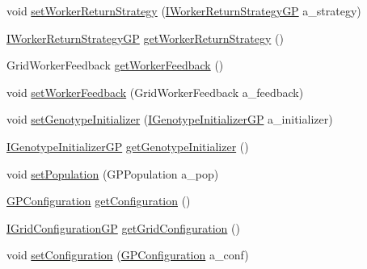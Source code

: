 \begin{DoxyCompactItemize}
\item 
void \hyperlink{classorg_1_1jgap_1_1distr_1_1grid_1_1gp_1_1_j_g_a_p_request_g_p_aa547978291ad96057848eed7b72f91ba}{set\-Worker\-Return\-Strategy} (\hyperlink{interfaceorg_1_1jgap_1_1distr_1_1grid_1_1gp_1_1_i_worker_return_strategy_g_p}{I\-Worker\-Return\-Strategy\-G\-P} a\-\_\-strategy)
\item 
\hyperlink{interfaceorg_1_1jgap_1_1distr_1_1grid_1_1gp_1_1_i_worker_return_strategy_g_p}{I\-Worker\-Return\-Strategy\-G\-P} \hyperlink{classorg_1_1jgap_1_1distr_1_1grid_1_1gp_1_1_j_g_a_p_request_g_p_a31191d5018e486864ec5762de10bafc5}{get\-Worker\-Return\-Strategy} ()
\item 
Grid\-Worker\-Feedback \hyperlink{classorg_1_1jgap_1_1distr_1_1grid_1_1gp_1_1_j_g_a_p_request_g_p_a4eb1db083d15fba5235c1a3e2de4a4d2}{get\-Worker\-Feedback} ()
\item 
void \hyperlink{classorg_1_1jgap_1_1distr_1_1grid_1_1gp_1_1_j_g_a_p_request_g_p_adfd2c2f2a4edb10f955959b45c608b4e}{set\-Worker\-Feedback} (Grid\-Worker\-Feedback a\-\_\-feedback)
\item 
void \hyperlink{classorg_1_1jgap_1_1distr_1_1grid_1_1gp_1_1_j_g_a_p_request_g_p_a2bd880a9f50c5faf7cc80ae986767fa3}{set\-Genotype\-Initializer} (\hyperlink{interfaceorg_1_1jgap_1_1distr_1_1grid_1_1gp_1_1_i_genotype_initializer_g_p}{I\-Genotype\-Initializer\-G\-P} a\-\_\-initializer)
\item 
\hyperlink{interfaceorg_1_1jgap_1_1distr_1_1grid_1_1gp_1_1_i_genotype_initializer_g_p}{I\-Genotype\-Initializer\-G\-P} \hyperlink{classorg_1_1jgap_1_1distr_1_1grid_1_1gp_1_1_j_g_a_p_request_g_p_a6e2f42e96f470d5be7966373be24c2ae}{get\-Genotype\-Initializer} ()
\item 
void \hyperlink{classorg_1_1jgap_1_1distr_1_1grid_1_1gp_1_1_j_g_a_p_request_g_p_a67b3f320ec6453dcddfde5785d91c115}{set\-Population} (G\-P\-Population a\-\_\-pop)
\item 
\hyperlink{classorg_1_1jgap_1_1gp_1_1impl_1_1_g_p_configuration}{G\-P\-Configuration} \hyperlink{classorg_1_1jgap_1_1distr_1_1grid_1_1gp_1_1_j_g_a_p_request_g_p_a6ffcc639a6aab2fa584ba03e9e9b964e}{get\-Configuration} ()
\item 
\hyperlink{interfaceorg_1_1jgap_1_1distr_1_1grid_1_1gp_1_1_i_grid_configuration_g_p}{I\-Grid\-Configuration\-G\-P} \hyperlink{classorg_1_1jgap_1_1distr_1_1grid_1_1gp_1_1_j_g_a_p_request_g_p_a8bae7966778640286ea35755f5f7b569}{get\-Grid\-Configuration} ()
\item 
void \hyperlink{classorg_1_1jgap_1_1distr_1_1grid_1_1gp_1_1_j_g_a_p_request_g_p_a612e8b7fac841775b9b3be7158d1527e}{set\-Configuration} (\hyperlink{classorg_1_1jgap_1_1gp_1_1impl_1_1_g_p_configuration}{G\-P\-Configuration} a\-\_\-conf)

\end{DoxyCompactItemize}
